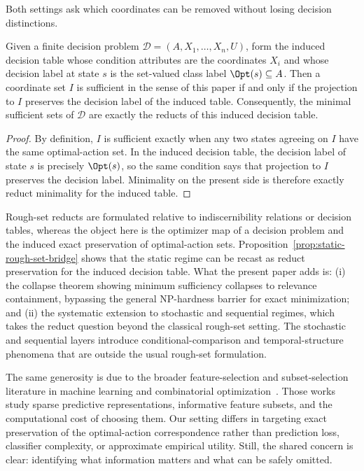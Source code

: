 Both settings ask which coordinates can be removed without losing decision distinctions.

\begin{proposition}\label{prop:static-rough-set-bridge}
Given a finite decision problem $\mathcal{D}=(A,X_1,\ldots,X_n,U)$, form the induced decision table whose condition attributes are the coordinates $X_i$ and whose decision label at state $s$ is the set-valued class label $\Opt(s) \subseteq A$. Then a coordinate set $I$ is sufficient in the sense of this paper if and only if the projection to $I$ preserves the decision label of the induced table. Consequently, the minimal sufficient sets of $\mathcal{D}$ are exactly the reducts of this induced decision table.
\end{proposition}


\begin{proof}
By definition, $I$ is sufficient exactly when any two states agreeing on $I$ have the same optimal-action set. In the induced decision table, the decision label of state $s$ is precisely $\Opt(s)$, so the same condition says that projection to $I$ preserves the decision label. Minimality on the present side is therefore exactly reduct minimality for the induced table.
\end{proof}

Rough-set reducts are formulated relative to indiscernibility relations or decision tables, whereas the object here is the optimizer map of a decision problem and the induced exact preservation of optimal-action sets. Proposition~\ref{prop:static-rough-set-bridge} shows that the static regime can be recast as reduct preservation for the induced decision table. What the present paper adds is: (i) the collapse theorem showing minimum sufficiency collapses to relevance containment, bypassing the general NP-hardness barrier for exact minimization; and (ii) the systematic extension to stochastic and sequential regimes, which takes the reduct question beyond the classical rough-set setting. The stochastic and sequential layers introduce conditional-comparison and temporal-structure phenomena that are outside the usual rough-set formulation.

The same generosity is due to the broader feature-selection and subset-selection literature in machine learning and combinatorial optimization~\cite{blum1997selection,amaldi1998complexity}. Those works study sparse predictive representations, informative feature subsets, and the computational cost of choosing them. Our setting differs in targeting exact preservation of the optimal-action correspondence rather than prediction loss, classifier complexity, or approximate empirical utility. Still, the shared concern is clear: identifying what information matters and what can be safely omitted.

